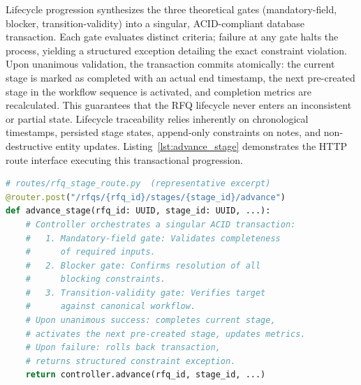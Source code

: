 Lifecycle progression synthesizes the three theoretical gates (mandatory-field, blocker, transition-validity) into a singular, ACID-compliant database transaction. Each gate evaluates distinct criteria; failure at any gate halts the process, yielding a structured exception detailing the exact constraint violation. Upon unanimous validation, the transaction commits atomically: the current stage is marked as completed with an actual end timestamp, the next pre-created stage in the workflow sequence is activated, and completion metrics are recalculated. This guarantees that the RFQ lifecycle never enters an inconsistent or partial state. Lifecycle traceability relies inherently on chronological timestamps, persisted stage states, append-only constraints on notes, and non-destructive entity updates. Listing~\ref{lst:advance_stage} demonstrates the HTTP route interface executing this transactional progression.

\begin{lstlisting}[language=Python, basicstyle=\ttfamily\footnotesize, frame=single, breaklines=true, captionpos=b, label={lst:advance_stage}, caption={Representative HTTP endpoint executing the three-gate stage advancement transaction. (Note: Dependency injection and error handling obfuscated for brevity).}]
# routes/rfq_stage_route.py  (representative excerpt)
@router.post("/rfqs/{rfq_id}/stages/{stage_id}/advance")
def advance_stage(rfq_id: UUID, stage_id: UUID, ...):
    # Controller orchestrates a singular ACID transaction:
    #   1. Mandatory-field gate: Validates completeness 
    #      of required inputs.
    #   2. Blocker gate: Confirms resolution of all 
    #      blocking constraints.
    #   3. Transition-validity gate: Verifies target 
    #      against canonical workflow.
    # Upon unanimous success: completes current stage,
    # activates the next pre-created stage, updates metrics.
    # Upon failure: rolls back transaction, 
    # returns structured constraint exception.
    return controller.advance(rfq_id, stage_id, ...)
\end{lstlisting}

